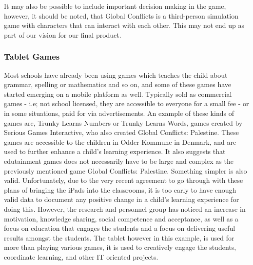It may also be possible to include important decision making in the game, however, it should be noted, that Global Conflicts is a third-person simulation game with characters that can interact with each other. This may not end up as part of our vision for our final product.

\subsubsection{Tablet Games}

Most schools have already been using games which teaches the child about grammar, spelling or mathematics and so on, and some of these games have started emerging on a mobile platform as well.
Typically sold as commercial games - i.e; not school licensed, they are accessible to everyone for a small fee - or in some situations, paid for via advertisements.
An example of these kinds of games are, Trunky Learns Numbers or Trunky Learns Words, games created by Serious Games Interactive, who also created Global Conflicts: Palestine.
These games are accessible to the children in Odder Kommune in Denmark, and are used to further enhance a child's learning experience.\cite{odderipad}
It also suggests that edutainment games does not necessarily have to be large and complex as the previously mentioned game Global Conflicts: Palestine.
Something simpler is also valid.
Unfortunately, due to the very recent agreement to go through with these plans of bringing the iPads into the classrooms, it is too early to have enough valid data to document any positive change in a child's learning experience for doing this.
However, the research and personnel group has noticed an increase in motivation, knowledge sharing, social competence and acceptance, as well as a focus on education that engages the students and a focus on delivering useful results amongst the students.\cite{odderipadpjece}
The tablet however in this example, is used for more than playing various games, it is used to creatively engage the students, coordinate learning, and other IT oriented projects.\cite{odderipadpjece}